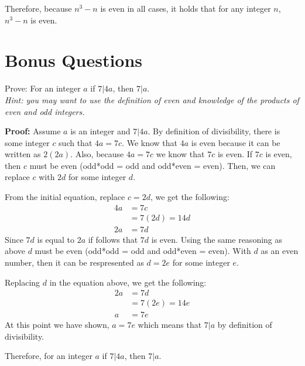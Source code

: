 \begin{questions}
\begin{solution}
\begin{itemize}[itemsep=0pt,parsep=0pt,topsep=0pt,partopsep=0pt]
        Therefore, because $n^3 - n$ is even in all cases, it holds that for any integer $n$, $n^3 - n$ is even.
    \end{itemize}
\end{solution}



\section*{Bonus Questions} 


\bonusquestion[6] Prove: For an integer $a$ if $7 | 4a$, then $7 | a$. \\
\textit{Hint: you may want to use the definition of even and knowledge of the products of even and odd integers.}
 \ifprintanswers
        \vspace{-10pt}
    \fi
  \begin{solution} 
  \textbf{Proof:}  Assume $a$ is an integer and $7 | 4a$.  By definition of divisibility, there is some integer $c$ such that $4a = 7c$.  We know that $4a$ is even because it can be written as $2(2a)$.  Also, because $4a = 7c$ we know that $7c$ is even.  If $7c$ is even, then $c$ must be even (odd*odd = odd and odd*even = even).  Then, we can replace $c$ with $2d$ for some integer $d$.  

  From the initial equation, replace $c=2d$, we get the following: 
  \begin{align*}
    4a &= 7c \\
      &= 7(2d) = 14d \\
    2a &= 7d \tag{divide by 2}
  \end{align*}
  Since $7d$ is equal to $2a$ if follows that $7d$ is even. Using the same reasoning as above $d$ must be even (odd*odd = odd and odd*even = even).  With $d$ as an even number, then it can be respresented as $d = 2e$ for some integer $e$. 

  Replacing $d$ in the equation above, we get the following:
  \begin{align*}
    2a &= 7d \\
      &= 7(2e) = 14e \\
    a &= 7e \tag{divide by 2}
  \end{align*}
  At this point we have shown, $a = 7e$ which means that $7 | a$ by definition of divisibility. 

  Therefore, for an integer $a$ if $7 | 4a$, then $7 | a$.

  \end{solution}


\end{questions}
